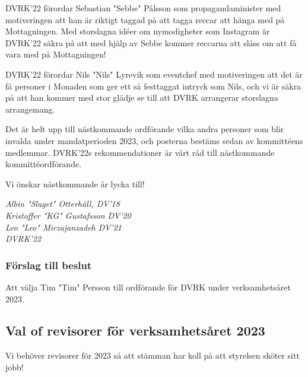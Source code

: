 \documentclass[protokoll]{dvd}
\begin{document}
DVRK'22 förordar Sebastian "Sebbe" Pålsson som propagandaminister med motiveringen att han är riktigt taggad på att tagga reccar att hänga med på Mottagningen.
Med storslagna idéer om nymodigheter som Instagram är DVRK'22 säkra på att med hjälp av Sebbe kommer reccarna att slåss om att få vara med på Mottagningen!

DVRK'22 förordar Nils "Nils" Lyrevik som eventchef med motiveringen att det är få personer i Monaden som ger ett så festtaggat intryck som Nils, och vi är säkra på att han kommer med stor glädje se till att DVRK arrangerar storslagna arrangemang.

Det är helt upp till nästkommande ordförande vilka andra personer som blir invalda under mandatperioden 2023, och posterna bestäms sedan av kommittéens medlemmar.
DVRK'22s rekommendationer är vårt råd till nästkommande kommittéordförande.

Vi önskar nästkommande år lycka till!

\emph{Albin "Slaget" Otterhäll, DV'18} \\
\emph{Kristoffer "KG" Gustafsson DV'20} \\
\emph{Leo "Leo" Mirzajanzadeh DV'21}\\
\emph{DVRK'22}

\subsubsection*{Förslag till beslut}
\begin{attsatser}
    \item Att välja Tim "Tim" Persson till ordförande för DVRK under verksamhetsåret 2023.
\end{attsatser}


\subsection{Val of revisorer för verksamhetsåret 2023}
Vi behöver revisorer för 2023 så att stämman har koll på att styrelsen sköter sitt jobb!
\end{document}
